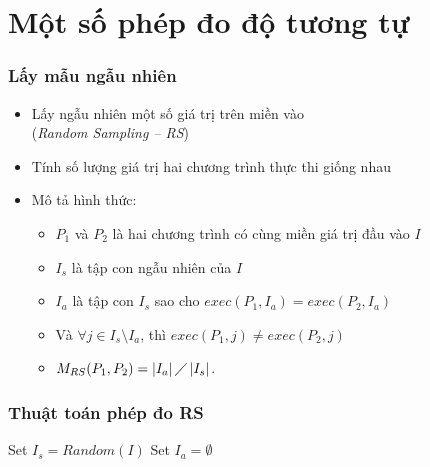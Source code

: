 \documentclass{beamer}
\begin{document}
\section{Một số phép đo độ tương tự}
\begin{frame}
  \frametitle{Lấy mẫu ngẫu nhiên}
  \begin{itemize}  	
  	\item Lấy ngẫu nhiên một số giá trị trên miền vào \\(\emph{Random
  		Sampling -- RS})
  	\item Tính số lượng giá trị hai chương trình
  	thực thi giống nhau
  	\item Mô tả hình thức:
  	\begin{itemize}
  		\item $P_{1}$ và $P_{2}$ là hai chương trình có cùng miền giá trị đầu
  		vào $I$
  		\item $I_{s}$ là tập con ngẫu nhiên của $I$
  		\item $I_{a}$ là tập con
  		$I_{s}$ sao cho $exec(P_{1}, I_a) = exec(P_{2}, I_a)$
  		\item Và $\forall j \in I_{s} \setminus I_{a}$, thì
  		$exec(P_{1}, j) \neq exec(P_{2}, j)$
  		\item $M_{RS}(P_{1}, P_{2}) = \left|I_{a}\right| \diagup
  		\left|I_{s}\right| $.
  	\end{itemize}
  \end{itemize}
\end{frame}


\begin{frame}
  \frametitle{Thuật toán phép đo RS}
  \begin{algorithm}[H]
	Set $I_{s} = Random(I)$ \;
	Set $I_{a} = \emptyset$\;
  	{  			
  	}
  \end{algorithm}
\end{frame}
\end{document}
